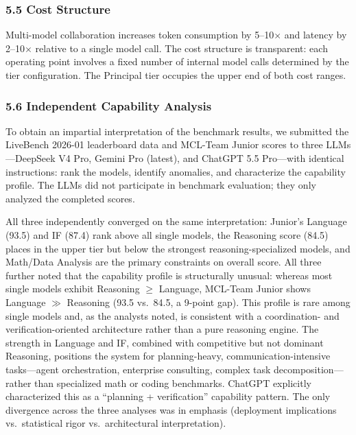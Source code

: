 \documentclass[
]{article}
\begin{document}
\subsubsection{5.5 Cost Structure}\label{cost-analysis}

Multi-model collaboration increases token consumption by 5--10$\times$ and latency by 2--10$\times$ relative to a single model call. The cost structure is transparent: each operating point involves a fixed number of internal model calls determined by the tier configuration. The Principal tier occupies the upper end of both cost ranges.

\subsubsection{5.6 Independent Capability Analysis}\label{capability-analysis}

To obtain an impartial interpretation of the benchmark results, we submitted the LiveBench 2026-01 leaderboard data and MCL-Team Junior scores to three LLMs---DeepSeek V4 Pro, Gemini Pro (latest), and ChatGPT 5.5 Pro---with identical instructions: rank the models, identify anomalies, and characterize the capability profile. The LLMs did not participate in benchmark evaluation; they only analyzed the completed scores.

All three independently converged on the same interpretation: Junior's Language (93.5) and IF (87.4) rank above all single models, the Reasoning score (84.5) places in the upper tier but below the strongest reasoning-specialized models, and Math/Data Analysis are the primary constraints on overall score. All three further noted that the capability profile is structurally unusual: whereas most single models exhibit Reasoning $\geq$ Language, MCL-Team Junior shows Language $\gg$ Reasoning (93.5 vs.\ 84.5, a 9-point gap). This profile is rare among single models and, as the analysts noted, is consistent with a coordination- and verification-oriented architecture rather than a pure reasoning engine. The strength in Language and IF, combined with competitive but not dominant Reasoning, positions the system for planning-heavy, communication-intensive tasks---agent orchestration, enterprise consulting, complex task decomposition---rather than specialized math or coding benchmarks. ChatGPT explicitly characterized this as a ``planning + verification'' capability pattern. The only divergence across the three analyses was in emphasis (deployment implications vs.\ statistical rigor vs.\ architectural interpretation).
\end{document}
